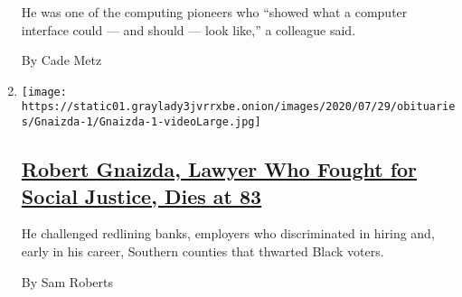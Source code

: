 \begin{enumerate}
  He was one of the computing pioneers who ``showed what a computer
  interface could --- and should --- look like,'' a colleague said.

  By Cade Metz
\item
  \texttt{[image: https://static01.graylady3jvrrxbe.onion/images/2020/07/29/obituaries/Gnaizda-1/Gnaizda-1-videoLarge.jpg]}

  \hypertarget{robert-gnaizda-lawyer-who-fought-for-social-justice-dies-at-83}{%
  \subsection{\texorpdfstring{\href{/2020/08/01/us/robert-gnaizda-dead.html}{Robert
  Gnaizda, Lawyer Who Fought for Social Justice, Dies at
  83}}{Robert Gnaizda, Lawyer Who Fought for Social Justice, Dies at 83}}\label{robert-gnaizda-lawyer-who-fought-for-social-justice-dies-at-83}}

  He challenged redlining banks, employers who discriminated in hiring
  and, early in his career, Southern counties that thwarted Black
  voters.

  By Sam Roberts
\end{enumerate}

